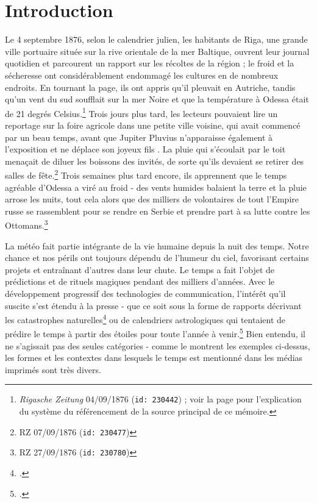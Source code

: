 \documentclass[a4paper,twoside,12pt]{article}
\begin{document}
\null\newpage
\thispagestyle{empty}
\null\newpage

\section*{Introduction}
\setcounter{page}{1}

Le 4 septembre 1876, selon le calendrier julien, les habitants de Riga, une grande ville portuaire située sur la rive orientale de la mer Baltique, ouvrent leur journal quotidien et parcourent un rapport sur les récoltes de la région ; le froid et la sécheresse ont considérablement endommagé les cultures en de nombreux endroits. En tournant la page, ils ont appris qu'il pleuvait en Autriche, tandis qu'un vent du sud soufflait sur la mer Noire et que la température à Odessa était de 21 degrés Celsius.\footnote{\textit{Rigasche Zeitung} 04/09/1876 (\texttt{id: 230442}) ; voir la page \pageref{id_indexing} pour l'explication du système du référencement de la source principal de ce mémoire.} Trois jours plus tard, les lecteurs pouvaient lire un reportage sur la foire agricole dans une petite ville voisine, qui avait commencé par un beau temps, avant que \og Jupiter Pluvius n'apparaisse également à l'exposition et ne déplace son joyeux fils \fg{}. La pluie qui s'écoulait par le toit menaçait de diluer les boissons des invités, de sorte qu'ils devaient se retirer des salles de fête.\footnote{RZ 07/09/1876 (\texttt{id: 230477})} Trois semaines plus tard encore, ils apprennent que le temps agréable d'Odessa a viré au froid - des vents humides balaient la terre et la pluie arrose les nuits, tout cela alors que des milliers de volontaires de tout l'Empire russe se rassemblent pour se rendre en Serbie et prendre part à sa lutte contre les Ottomans.\footnote{RZ 27/09/1876 (\texttt{id: 230780})}

La météo fait partie intégrante de la vie humaine depuis la nuit des temps. Notre chance et nos périls ont toujours dépendu de l'humeur du ciel, favorisant certains projets et entraînant d'autres dans leur chute. Le temps a fait l'objet de prédictions et de rituels magiques pendant des milliers d'années. Avec le développement progressif des technologies de communication, l'intérêt qu'il suscite s'est étendu à la presse - que ce soit sous la forme de rapports décrivant les catastrophes naturelles\footcite[Pour une étude de cas, cf :][19-38]{koopmans_early_2018} ou de calendriers astrologiques qui tentaient de prédire le temps à partir des étoiles pour toute l'année à venir.\footcite[][]{beiderbeck_meteorologische_2021} Bien entendu, il ne s'agissait pas des seules catégories - comme le montrent les exemples ci-dessus, les formes et les contextes dans lesquels le temps est mentionné dans les médias imprimés sont très divers.
\end{document}
